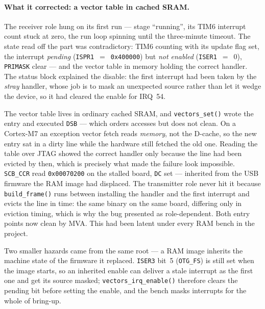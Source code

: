 \paragraph{What it corrected: a vector table in cached SRAM.} The
receiver role hung on its first run --- stage ``running'', its TIM6
interrupt count stuck at zero, the run loop spinning until the
three-minute timeout. The state read off the part was contradictory:
TIM6 counting with its update flag set, the interrupt \emph{pending}
(\texttt{ISPR1}~$=$~\texttt{0x400000}) but \emph{not enabled}
(\texttt{ISER1}~$=$~0), \texttt{PRIMASK} clear --- and the vector table
in memory holding the correct handler. The status block explained the
disable: the first interrupt had been taken by the \emph{stray} handler,
whose job is to mask an unexpected source rather than let it wedge the
device, so it had cleared the enable for IRQ~54.

The vector table lives in ordinary cached SRAM, and
\texttt{vectors\_set()} wrote the entry and executed \texttt{DSB} ---
which orders accesses but does not clean. On a Cortex-M7 an exception
vector fetch reads \emph{memory}, not the D-cache, so the new entry sat
in a dirty line while the hardware still fetched the old one. Reading
the table over JTAG showed the correct handler only because the line had
been evicted by then, which is precisely what made the failure look
impossible. \texttt{SCB\_CCR} read \texttt{0x00070200} on the stalled
board, \texttt{DC} set --- inherited from the USB firmware the RAM image
had displaced. The transmitter role never hit it because
\texttt{build\_frame()} runs between installing the handler and the
first interrupt and evicts the line in time: the same binary on the same
board, differing only in eviction timing, which is why the bug presented
as role-dependent. Both entry points now clean by MVA. This had been
latent under every RAM bench in the project.

Two smaller hazards came from the same root --- a RAM image inherits the
machine state of the firmware it replaced. \texttt{ISER3} bit~5
(\texttt{OTG\_FS}) is still set when the image starts, so an inherited
enable can deliver a stale interrupt as the first one and get its source
masked; \texttt{vectors\_irq\_enable()} therefore clears the pending bit
before setting the enable, and the bench masks interrupts for the whole
of bring-up.

